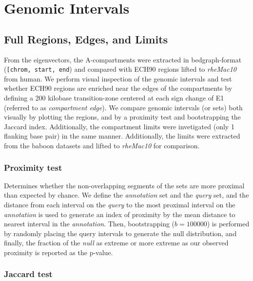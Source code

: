 \documentclass[
  11pt,
  a4paper,
]{scrbook}
\begin{document}
\section{Genomic Intervals}\label{genomic-intervals}

\subsection{Full Regions, Edges, and
Limits}\label{full-regions-edges-and-limits}

From the eigenvectors, the A-compartments were extracted in
bedgraph-format
(\texttt{{[}\textquotesingle{}chrom\textquotesingle{},\ \textquotesingle{}start\textquotesingle{},\ \textquotesingle{}end\textquotesingle{}{]}})
and compared with ECH90 regions lifted to \emph{rheMac10} from human. We
perform visual inspection of the genomic intervals and test whether
ECH90 regions are enriched near the edges of the compartments by
defining a 200 kilobase transition-zone centered at each sign change of
E1 (referred to as \emph{compartment edge}). We compare genomic
intervals (or sets) both visually by plotting the regions, and by a
proximity test and bootstrapping the Jaccard index. Additionally, the
compartment limits were invetigated (only 1 flanking base pair) in the
same manner. Additionally, the limits were extracted from the baboon
datasets and lifted to \emph{rheMac10} for comparison.

\subsubsection{Proximity test}\label{proximity-test}

Determines whether the non-overlapping segments of the sets are more
proximal than expected by chance. We define the \emph{annotation} set
and the \emph{query} set, and the distance from each interval on the
\emph{query} to the most proximal interval on the \emph{annotation} is
used to generate an index of proximity by the mean distance to nearest
interval in the \emph{annotation}. Then, bootstrapping (\(b = 100000\))
is performed by randomly placing the query intervals to generate the
null distribution, and finally, the fraction of the \emph{null} as
extreme or more extreme as our observed proximity is reported as the
p-value.

\subsubsection{Jaccard test}\label{jaccard-test}
\end{document}
